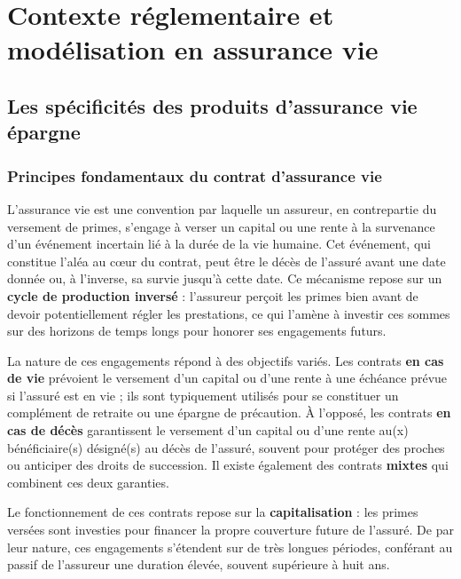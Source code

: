 \chapter{Contexte réglementaire et modélisation en assurance vie}
\label{chap:contexte}
\newpage
\section{Les spécificités des produits d'assurance vie épargne}
\label{sec:spec_av}

\subsection{Principes fondamentaux du contrat d'assurance vie}

L'assurance vie est une convention par laquelle un assureur, en contrepartie du versement de primes, s'engage à verser un capital ou une rente à la survenance d'un événement incertain lié à la durée de la vie humaine. Cet événement, qui constitue l'aléa au cœur du contrat, peut être le décès de l'assuré avant une date donnée ou, à l'inverse, sa survie jusqu'à cette date. Ce mécanisme repose sur un \textbf{cycle de production inversé} : l'assureur perçoit les primes bien avant de devoir potentiellement régler les prestations, ce qui l'amène à investir ces sommes sur des horizons de temps longs pour honorer ses engagements futurs.

\bigskip

La nature de ces engagements répond à des objectifs variés. Les contrats \textbf{en cas de vie} prévoient le versement d'un capital ou d'une rente à une échéance prévue si l'assuré est en vie ; ils sont typiquement utilisés pour se constituer un complément de retraite ou une épargne de précaution. À l'opposé, les contrats \textbf{en cas de décès} garantissent le versement d'un capital ou d'une rente au(x) bénéficiaire(s) désigné(s) au décès de l'assuré, souvent pour protéger des proches ou anticiper des droits de succession. Il existe également des contrats \textbf{mixtes} qui combinent ces deux garanties.

\bigskip

Le fonctionnement de ces contrats repose sur la \textbf{capitalisation} : les primes versées sont investies pour financer la propre couverture future de l'assuré. De par leur nature, ces engagements s'étendent sur de très longues périodes, conférant au passif de l'assureur une duration élevée, souvent supérieure à huit ans.

